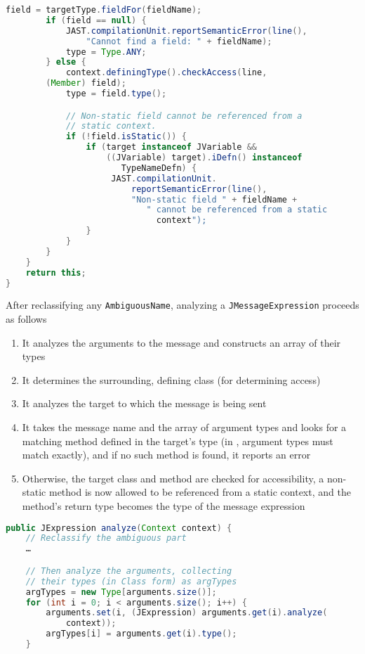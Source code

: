\documentclass[8pt,a4paper,compress]{beamer}
\begin{document}
\begin{frame}[fragile]
\pause

\begin{lstlisting}[language=Java,style=focusin]
        field = targetType.fieldFor(fieldName);
        if (field == null) {
            JAST.compilationUnit.reportSemanticError(line(),
                "Cannot find a field: " + fieldName);
            type = Type.ANY;
        } else {
            context.definingType().checkAccess(line,
		(Member) field);
            type = field.type();

            // Non-static field cannot be referenced from a
            // static context.
            if (!field.isStatic()) {
                if (target instanceof JVariable &&
                    ((JVariable) target).iDefn() instanceof
                       TypeNameDefn) {
                     JAST.compilationUnit.
                         reportSemanticError(line(),
                         "Non-static field " + fieldName +
                            " cannot be referenced from a static
                              context");
                }
            }
        }
    }
    return this;
}
\end{lstlisting}
\end{frame}

\begin{frame}[fragile]
\pause

After reclassifying any \lstinline{AmbiguousName}, analyzing a \lstinline{JMessageExpression} proceeds as follows

\begin{enumerate}
\pause
\item It analyzes the arguments to the message and constructs an array of their types
\pause
\item It determines the surrounding, defining class (for determining access)
\pause
\item It analyzes the target to which the message is being sent
\pause
\item It takes the message name and the array of argument types and looks for a matching method defined in the target's type (in \jmm, argument types must match exactly), and if no such method is found, it reports an error
\pause
\item Otherwise, the target class and method are checked for accessibility, a non-static method is now allowed to be referenced from a static context, and the method's return type becomes the type of the message expression
\end{enumerate}

\begin{lstlisting}[language=Java,style=focusin]
public JExpression analyze(Context context) {
    // Reclassify the ambiguous part
    …

    // Then analyze the arguments, collecting
    // their types (in Class form) as argTypes
    argTypes = new Type[arguments.size()];
    for (int i = 0; i < arguments.size(); i++) {
        arguments.set(i, (JExpression) arguments.get(i).analyze(
            context));
        argTypes[i] = arguments.get(i).type();
    }
\end{lstlisting}
\end{frame}
\end{document}
